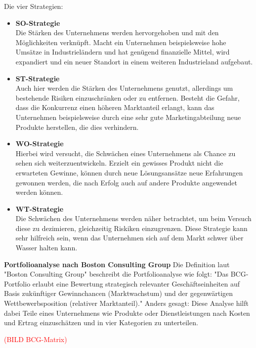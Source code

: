   Die vier Strategien:
  \begin{itemize}
    \item \textbf{SO-Strategie}\\
    Die Stärken des Unternehmens werden hervorgehoben und mit den Möglichkeiten verknüpft. Macht ein Unternehmen beispielsweise hohe Umsätze in Industrieländern und hat
    genügend finanzielle Mittel, wird expandiert und ein neuer Standort in einem weiteren Industrieland aufgebaut.

    \item \textbf{ST-Strategie}\\
    Auch hier werden die Stärken des Unternehmens genutzt, allerdings um bestehende Risiken einzuschränken oder zu entfernen. Besteht die Gefahr, dass die Konkurrenz
    einen höheren Marktanteil erlangt, kann das Unternehmen beispielsweise durch eine sehr gute Marketingabteilung neue Produkte herstellen, die dies verhindern.

    \item \textbf{WO-Strategie}\\
    Hierbei wird versucht, die Schwächen eines Unternehmens als Chance zu sehen sich weiterzuentwickeln. Erzielt ein gewisses Produkt nicht die erwarteten Gewinne,
    können durch neue Lösungsansätze neue Erfahrungen gewonnen werden, die nach Erfolg auch auf andere Produkte angewendet werden können.

    \item \textbf{WT-Strategie}\\
    Die Schwächen des Unternehmens werden näher betrachtet, um beim Versuch diese zu dezimieren, gleichzeitig Riskiken einzugrenzen. Diese Strategie kann sehr hilfreich
    sein, wenn das Unternehmen sich auf dem Markt schwer über Wasser halten kann.
  \end{itemize}

  \textbf{Portfolioanalyse nach Boston Consulting Group}
  Die Definition laut {"Boston Consulting Group"\cite{portfolioanalyse}} beschreibt die Portfolioanalyse wie folgt:
  "Das BCG-Portfolio erlaubt eine Bewertung strategisch relevanter Geschäftseinheiten auf Basis zukünftiger Gewinnchancen (Marktwachstum) und der
  gegenwärtigen Wettbewerbsposition (relativer Marktanteil)." Anders gesagt: Diese Analyse hilft dabei Teile eines Unternehmens wie Produkte oder Dienstleistungen
  nach Kosten und Ertrag einzuschätzen und in vier Kategorien zu unterteilen.

  \textcolor{red}{(BILD BCG-Matrix)}

